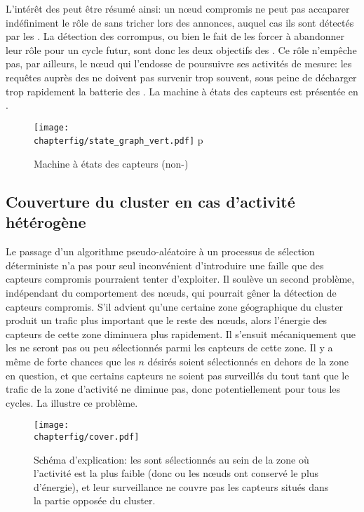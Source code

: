 L'intérêt des \vns peut être résumé ainsi: un nœud compromis ne peut pas accaparer indéfiniment le rôle de \cn sans tricher lors des annonces, auquel cas ils sont détectés par les \vns.
La détection des \cns corrompus, ou bien le fait de les forcer à abandonner leur rôle pour un cycle futur, sont donc les deux objectifs des \vns.
Ce rôle n'empêche pas, par ailleurs, le nœud qui l'endosse de poursuivre ses activités de mesure: les requêtes auprès des \cns ne doivent pas survenir trop souvent, sous peine de décharger trop rapidement la batterie des \vns.
La machine à états des capteurs est présentée en .
\begin{figure}[p]
    \centering
    \newlength\figuretotextheight
    \setlength\figuretotextheight\textheight
    \addtolength\figuretotextheight{-\abovecaptionskip}
    \addtolength\figuretotextheight{-\baselineskip}
    \texttt{[image: \\chapterfig/state\_graph\_vert.pdf]}%
    \newbox\dpbox%
    \setbox\dpbox\hbox{p}%
    \vspace{-\dp\dpbox}%
    \caption{Machine à états des capteurs (non-\cn)}\label{se:fig:states}%
\end{figure}

    \subsection{Couverture du cluster en cas d'activité hétérogène}

Le passage d'un algorithme pseudo-aléatoire à un processus de sélection déterministe n'a pas pour seul inconvénient d'introduire une faille que des capteurs compromis pourraient tenter d'exploiter.
Il soulève un second problème, indépendant du comportement des nœuds, qui pourrait gêner la détection de capteurs compromis.
S'il advient qu'une certaine zone géographique du cluster produit un trafic plus important que le reste des nœuds, alors l'énergie des capteurs de cette zone diminuera plus rapidement.
Il s'ensuit mécaniquement que les \cns ne seront pas ou peu sélectionnés parmi les capteurs de cette zone.
Il y a même de forte chances que les $n$ \cns désirés soient sélectionnés en dehors de la zone en question, et que certains capteurs ne soient pas surveillés du tout tant que le trafic de la zone d'activité ne diminue pas, donc potentiellement pour tous les cycles.
La  illustre ce problème.
\begin{figure}[ht]
    \centering
    \texttt{[image: \\chapterfig/cover.pdf]}
    \caption[Schéma d'explication: problème de couverture]{Schéma d'explication: les \cns sont sélectionnés au sein de la zone où l'activité est la plus faible (donc ou les nœuds ont conservé le plus d'énergie), et leur surveillance ne couvre pas les capteurs situés dans la partie opposée du cluster.}\label{se:fig:cover}
\end{figure}

